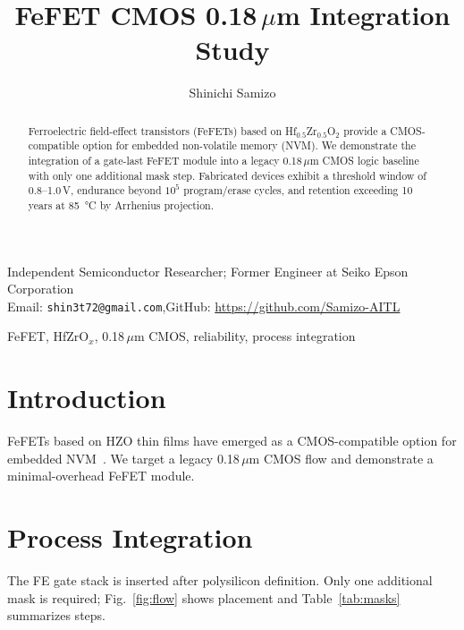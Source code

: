 \documentclass[journal]{IEEEtran}
\begin{document}
\title{FeFET CMOS 0.18\,$\mu$m Integration Study}
\author{Shinichi Samizo}
\maketitle

\begingroup
\centering\small
Independent Semiconductor Researcher; Former Engineer at Seiko Epson Corporation\\
Email: \texttt{shin3t72@gmail.com},\quad GitHub: \url{https://github.com/Samizo-AITL}
\par\endgroup

\begin{abstract}
Ferroelectric field-effect transistors (FeFETs) based on Hf$_{0.5}$Zr$_{0.5}$O$_2$ provide a CMOS-compatible option for embedded non-volatile memory (NVM). We demonstrate the integration of a gate-last FeFET module into a legacy 0.18\,$\mu$m CMOS logic baseline with only one additional mask step. Fabricated devices exhibit a threshold window of 0.8--1.0\,V, endurance beyond $10^5$ program/erase cycles, and retention exceeding 10 years at \SI{85}{\celsius} by Arrhenius projection.
\end{abstract}

\begin{IEEEkeywords}
FeFET, HfZrO$_x$, 0.18\,$\mu$m CMOS, reliability, process integration
\end{IEEEkeywords}

\section{Introduction}
FeFETs based on HZO thin films have emerged as a CMOS-compatible option for embedded NVM~\cite{Boscke2011,Mueller2012,Schenk2019}. We target a legacy 0.18\,$\mu$m CMOS flow and demonstrate a minimal-overhead FeFET module.

\section{Process Integration}
The FE gate stack is inserted after polysilicon definition. Only one additional mask is required; Fig.~\ref{fig:flow} shows placement and Table~\ref{tab:masks} summarizes steps.
\end{document}
